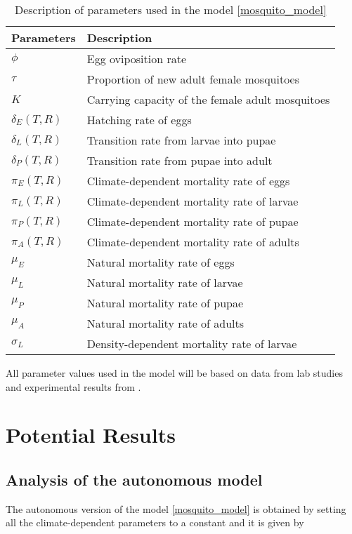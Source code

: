 \documentclass[12pt,a4paper,titlepage]{article}
\begin{document}
\begin{table}[h!]
	\begin{center}
		\caption{Description of parameters used in the model \ref{mosquito_model}}
		\label{tab:table2}
		\begin{tabular}{l|l} %
			\hline
			\textbf{Parameters} & \textbf{Description} \\
			\hline
			$\phi$ & Egg oviposition rate \\
			$\tau$ & Proportion of new adult female mosquitoes \\
			$K$ & Carrying capacity of the female adult mosquitoes \\
			$\delta_E(T, R)$ & Hatching rate of eggs \\
			$\delta_L(T, R)$ & Transition rate from larvae into pupae\\
			$\delta_P(T,R)$ & Transition rate from pupae into adult\\
			$\pi_E(T, R)$ & Climate-dependent mortality rate of eggs\\
			$\pi_L(T, R)$ & Climate-dependent mortality rate of larvae\\
			$\pi_P(T, R)$ & Climate-dependent mortality rate of pupae\\
			$\pi_A(T, R)$ & Climate-dependent mortality rate of adults\\
			$\mu_E$ & Natural mortality rate of eggs\\
			$\mu_L$ & Natural mortality rate of larvae\\
			$\mu_P$ & Natural mortality rate of pupae\\
			$\mu_A$ & Natural mortality rate of adults\\
			$\sigma_L$ & Density-dependent mortality rate of larvae\\
		\end{tabular}
	\end{center}
\end{table}

All parameter values used in the model will be based on data from lab studies and experimental results from \cite{bayoh2004temperature, bayoh2003effect, yang2011follow, esteva2015assessing}. 


\section{Potential Results}
\subsection{Analysis of the autonomous model}
The autonomous version of the model \ref{mosquito_model} is obtained by setting all the climate-dependent parameters to a constant and it is given by 
\end{document}
